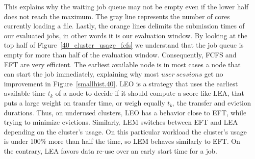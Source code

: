 \documentclass[conference]{IEEEtran}
\newcommand{\uss}{\ensuremath{\mathit{user~sessions}}\xspace}
\begin{document}
This explains why the waiting job queue may not be empty even if the lower half does not reach the maximum.
The gray line represents the number of cores currently loading a file.
Lastly, the orange lines delimits the submission times of our 
evaluated jobs, in other words it is our evaluation window.
By looking at the top half of Figure~\ref{40_cluster_usage_fcfs}
we understand that the job queue is empty for more than half of the evaluation window.
Consequently, FCFS and EFT are very efficient. The earliest available node is in
most cases a node that can start the job immediately, explaining why
most \uss get no improvement in Figure~\ref{smallhist.40}.
LEO is a strategy that uses the earliest available time $t_k$ of a node to decide if it should compute a score like LEA,
that puts a large weight on transfer time,
or weigh equally $t_k$, the transfer and eviction durations. 
Thus, on underused clusters, LEO has a behavior close to EFT, while trying to minimize evictions.
Similarly, LEM switches between EFT and LEA depending on the cluster's usage.
On this particular workload the cluster's usage is under 100\% more than half the time, so LEM behaves similarly to EFT.
On the contrary, LEA favors data re-use over an early start time for a job.

\begin{table}
\caption{Percentage of reduction in data transfer time relative to FCFS on the workload of week 40.}\label{tab.40}
\end{table}
\end{document}
